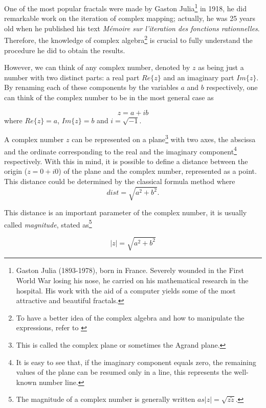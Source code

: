 \documentclass{article}
\begin{document}
One of the most popular fractals were made by Gaston Julia\footnote{Gaston Julia (1893-1978), born in France. Severely wounded in the First World War losing his nose, he carried on his mathematical research in the hospital. His work with the aid of a computer yields some of the most attractive and beautiful fractals.} in 1918, he did remarkable work on the iteration of complex mapping; actually, he was 25 years old when he published his text \textit{Mémoire  sur  l’iteration  des  fonctions  rationnelles}\cite{PJS}. Therefore, the knowledge of complex algebra\footnote{ To have a better idea of the complex algebra and how to manipulate the expressions, refer to \cite{wolfram}} is crucial to fully understand the procedure he did to obtain the results.

However, we can think of any complex number, denoted by $z$ as being just a number with two distinct parts: a real part $Re\{z\}$ and an imaginary part $Im\{z\}$. By renaming each of these components by the variables $a$ and $b$ respectively, one can think of the complex number to be in the most general case as

\begin{equation}
    z=a+ib
\end{equation} where $Re\{z\} = a$, $Im\{z\} = b$ and $i=\sqrt{-1}$.

 A complex number $z$ can be represented on a plane\footnote{This is called the complex plane or sometimes the Agrand plane.} with two axes, the abscissa and the ordinate corresponding to the real and the imaginary component\footnote{It is easy to see that, if the imaginary component equals zero, the remaining values of the plane can be resumed only in a line, this represents the well-known number line.} respectively. With this in mind, it is possible to define a distance between the origin ($z=0+i0$) of the plane and the complex number, represented as a point. This distance could be determined by the classical formula method where
\begin{equation}
    dist = \sqrt{a^2 + b^2}.
\end{equation}

This distance is an important parameter of the complex number, it is usually called \textit{magnitude}, stated as\footnote{The magnitude of a complex number is generally written $as |z| =\sqrt{z\tilde{z}}$.} 

\begin{equation}
    |z| = \sqrt{a^2 + b^2}
\end{equation}
\end{document}
